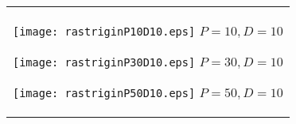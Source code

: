 \documentclass[a4paper,11pt,oneside,openany]{jsbook}
\begin{document}
\begin{figure}[htbp]
  \begin{center}
    \begin{tabular}{c}


      \begin{minipage}{0.33\hsize}
        \begin{center}
          \texttt{[image: rastriginP10D10.eps]}
          \hspace{1.2cm}$P=10, D=10
$        \end{center}
      \end{minipage}

      \begin{minipage}{0.33\hsize}
        \begin{center}
          \texttt{[image: rastriginP30D10.eps]}
          \hspace{1.2cm}$P=30, D=10
$        \end{center}
      \end{minipage}

      \begin{minipage}{0.33\hsize}
        \begin{center}
          \texttt{[image: rastriginP50D10.eps]}
          \hspace{1.2cm}$P=50, D=10
$        \end{center}
      \end{minipage}
    \end{tabular}
  \end{center}
\end{figure}
\end{document}
